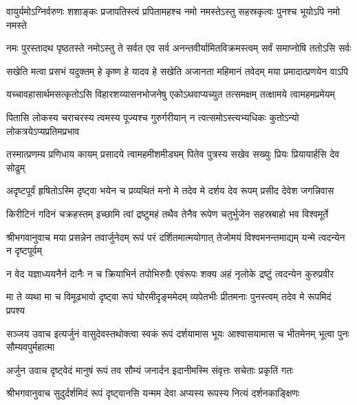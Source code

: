\fourlineindentedshloka
{वायुर्यमोऽग्निर्वरुणः शशाङ्कः}
{प्रजापतिस्त्वं प्रपितामहश्च}
{नमो नमस्तेऽस्तु सहस्रकृत्वः}
{पुनश्च भूयोऽपि नमो नमस्ते}%

\fourlineindentedshloka
{नमः पुरस्तादथ पृष्ठतस्ते}
{नमोऽस्तु ते सर्वत एव सर्व}
{अनन्तवीर्यामितविक्रमस्त्वम्}
{सर्वं समाप्नोषि ततोऽसि सर्वः}%

\fourlineindentedshloka
{सखेति मत्वा प्रसभं यदुक्तम्}
{हे कृष्ण हे यादव हे सखेति}
{अजानता महिमानं तवेदम्}
{मया प्रमादात्प्रणयेन वाऽपि}%

\fourlineindentedshloka
{यच्चावहासार्थमसत्कृतोऽसि}
{विहारशय्यासनभोजनेषु}
{एकोऽथवाप्यच्युत तत्समक्षम्}
{तत्क्षामये त्वामहमप्रमेयम्}%

\fourlineindentedshloka
{पितासि लोकस्य चराचरस्य}
{त्वमस्य पूज्यश्च गुरुर्गरीयान्}
{न त्वत्समोऽस्त्यभ्यधिकः कुतोऽन्यो}
{लोकत्रयेऽप्यप्रतिमप्रभाव}%

\fourlineindentedshloka
{तस्मात्प्रणम्य प्रणिधाय कायम्}
{प्रसादये त्वामहमीशमीड्यम्}
{पितेव पुत्रस्य सखेव सख्युः}
{प्रियः प्रियायार्हसि देव सोढुम्}%

\fourlineindentedshloka
{अदृष्टपूर्वं हृषितोऽस्मि दृष्ट्वा}
{भयेन च प्रव्यथितं मनो मे}
{तदेव मे दर्शय देव रूपम्}
{प्रसीद देवेश जगन्निवास}%

\fourlineindentedshloka
{किरीटिनं गदिनं चक्रहस्तम्}
{इच्छामि त्वां द्रष्टुमहं तथैव}
{तेनैव रूपेण चतुर्भुजेन}
{सहस्रबाहो भव विश्वमूर्ते}%

\fourlineindentedshloka
{श्रीभगवानुवाच}
{मया प्रसन्नेन तवार्जुनेदम्}
{रूपं परं दर्शितमात्मयोगात्}
{तेजोमयं विश्वमनन्तमाद्यम्}
{यन्मे त्वदन्येन न दृष्टपूर्वम्}%

\fourlineindentedshloka
{न वेद यज्ञाध्ययनैर्न दानैः}
{न च क्रियाभिर्न तपोभिरुग्रैः}
{एवंरूपः शक्य अहं नृलोके}
{द्रष्टुं त्वदन्येन कुरुप्रवीर}%

\fourlineindentedshloka
{मा ते व्यथा मा च विमूढभावो}
{दृष्ट्वा रूपं घोरमीदृङ्ममेदम्}
{व्यपेतभीः प्रीतमनाः पुनस्त्वम्}
{तदेव मे रूपमिदं प्रपश्य}%

{सञ्जय उवाच}
\fourlineindentedshloka
{इत्यर्जुनं वासुदेवस्तथोक्त्वा}
{स्वकं रूपं दर्शयामास भूयः}
{आश्वासयामास च भीतमेनम्}
{भूत्वा पुनः सौम्यवपुर्महात्मा}%

{अर्जुन उवाच}
\twolineshloka
{दृष्ट्वेदं मानुषं रूपं तव सौम्यं जनार्दन}
{इदानीमस्मि संवृत्तः सचेताः प्रकृतिं गतः}%

{श्रीभगवानुवाच}
\twolineshloka
{सुदुर्दर्शमिदं रूपं दृष्ट्वानसि यन्मम}
{देवा अप्यस्य रूपस्य नित्यं दर्शनकाङ्क्षिणः}%

